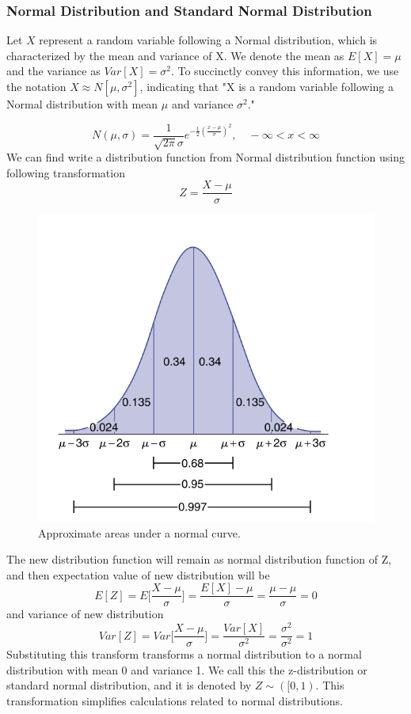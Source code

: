 \documentclass[12pt,a4paper]{article}
\theoremstyle{example}
\theoremstyle{definition}
\theoremstyle{theorem}
\begin{document}
\subsubsection{Normal Distribution and Standard Normal Distribution}
 Let $X$ represent a random variable following a Normal distribution, which is characterized by the mean and variance of X. We denote the mean as $E[X] = \mu$ and the variance as $Var[X] = \sigma^2$. To succinctly convey this information, we use the notation $X\approx N[\mu, \sigma^2]$, indicating that "X is a random variable following a Normal distribution with mean $\mu$ and variance $\sigma^2$."
 
\begin{equation}
     N(\mu, \sigma) = \frac{1}{\sqrt{2\pi}\sigma} e^{-\frac{1}{2}\left(\frac{x - \mu}{\sigma}\right)^2}, \quad -\infty< x < \infty 
\end{equation}
We can find write a distribution function from Normal distribution function using following transformation 
\begin{equation}
    Z=\frac{X-\mu}{\sigma}
    \label{tranform}
\end{equation}
\begin{figure}
    \centering
    \includegraphics[width=.6\textwidth]{Screenshot from 2023-11-13 15-10-44.png}
    \caption{Approximate areas under a normal curve.}
    \label{normadist-label}
\end{figure}
\pagebreak 
The new distribution function will remain as normal distribution function of Z, and then expectation value of new distribution will be \\
$$ E[Z]=E\big[\frac{X-\mu}{\sigma}\big]=\frac{E[X]-\mu}{\sigma}=\frac{\mu-\mu}{\sigma}=0$$ and variance of new distribution 
$$Var[Z]= Var\big[\frac{X-\mu}{\sigma}\big]=\frac{Var[X]}{\sigma^2}=\frac{\sigma^2}{\sigma^2}=1$$
Substituting this transform transforms a normal distribution to a normal distribution with mean 0 and variance 1. We call this the z-distribution or standard normal distribution, and it is denoted by $Z\sim ([0,1)$. This transformation simplifies calculations related to normal distributions.
\end{document}
